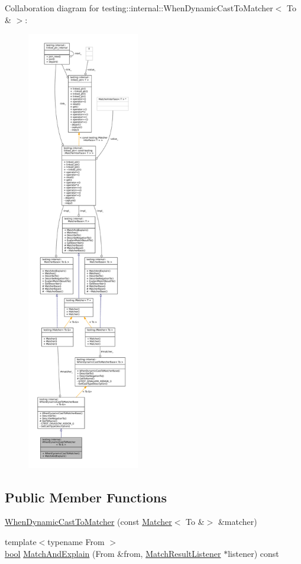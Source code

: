 Collaboration diagram for testing\+:\+:internal\+:\+:When\+Dynamic\+Cast\+To\+Matcher$<$ To \& $>$\+:
\nopagebreak
\begin{figure}[H]
\begin{center}
\leavevmode
\includegraphics[height=550pt]{classtesting_1_1internal_1_1WhenDynamicCastToMatcher_3_01To_01_6_01_4__coll__graph}
\end{center}
\end{figure}
\subsection*{Public Member Functions}
\begin{DoxyCompactItemize}
\item 
\hyperlink{classtesting_1_1internal_1_1WhenDynamicCastToMatcher_3_01To_01_6_01_4_a1ba7bc63566075d2afe18905e5c7ad76}{When\+Dynamic\+Cast\+To\+Matcher} (const \hyperlink{classtesting_1_1Matcher}{Matcher}$<$ To \&$>$ \&matcher)
\item 
{\footnotesize template$<$typename From $>$ }\\\hyperlink{classbool}{bool} \hyperlink{classtesting_1_1internal_1_1WhenDynamicCastToMatcher_3_01To_01_6_01_4_a1eb76a60d0943519623f438b29f70a5f}{Match\+And\+Explain} (From \&from, \hyperlink{classtesting_1_1MatchResultListener}{Match\+Result\+Listener} $\ast$listener) const
\end{DoxyCompactItemize}
